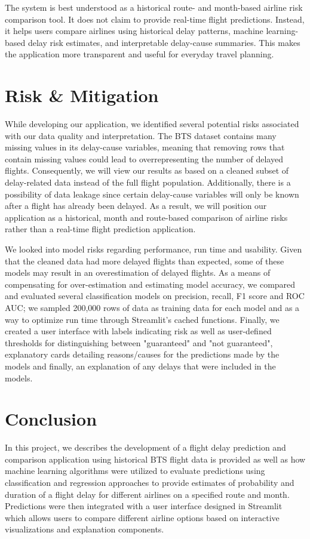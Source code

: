 The system is best understood as a historical route- and month-based airline risk comparison tool. It does not claim to provide real-time flight predictions. Instead, it helps users compare airlines using historical delay patterns, machine learning-based delay risk estimates, and interpretable delay-cause summaries. This makes the application more transparent and useful for everyday travel planning.


\section{Risk \& Mitigation}

While developing our application, we identified several potential risks associated with our data quality and interpretation. The BTS dataset contains many missing values in its delay-cause variables, meaning that removing rows that contain missing values could lead to overrepresenting the number of delayed flights. Consequently, we will view our results as based on a cleaned subset of delay-related data instead of the full flight population. Additionally, there is a possibility of data leakage since certain delay-cause variables will only be known after a flight has already been delayed. As a result, we will position our application as a historical, month and route-based comparison of airline risks rather than a real-time flight prediction application.

We looked into model risks regarding performance, run time and usability. Given that the cleaned data had more delayed flights than expected, some of these models may result in an overestimation of delayed flights. As a means of compensating for over-estimation and estimating model accuracy, we compared and evaluated several classification models on precision, recall, F1 score and ROC AUC; we sampled 200,000 rows of data as training data for each model and as a way to optimize run time through Streamlit's cached functions. Finally, we created a user interface with labels indicating risk as well as user-defined thresholds for distinguishing between "guaranteed" and "not guaranteed", explanatory cards detailing reasons/causes for the predictions made by the models and finally, an explanation of any delays that were included in the models.

\section{Conclusion}

In this project, we describes the development of a flight delay prediction and comparison application using historical BTS flight data is provided as well as how machine learning algorithms were utilized to evaluate predictions using classification and regression approaches to provide estimates of probability and duration of a flight delay for different airlines on a specified route and month. Predictions were then integrated with a user interface designed in Streamlit which allows users to compare different airline options based on interactive visualizations and explanation components.

